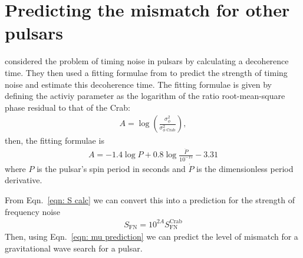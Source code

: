 \documentclass[../full_thesis/full_thesis.tex]{subfiles}
\begin{document}
{\section{Predicting the mismatch for other pulsars}
\citet{Jones2004} considered the problem of timing noise in pulsars by
calculating a decoherence time. They then used a fitting formulae from
\citet{Dewey1989} to predict the strength of timing noise and estimate this
decoherence time. The fitting formulae is given by defining the activiy
parameter as the logarithm of the ratio root-mean-square phase residual
to that of the Crab:
\begin{align}
A = \log\left(\frac{\sigma^{2}_{\phi}}{\sigma_{\phi\; \textrm{Crab}}^{2}}\right),
\end{align}
then, the fitting formulae is
\begin{align}
A = -1.4\log P + 0.8 \log \frac{\dot{P}}{10^{-15}} - 3.31
\end{align}
where $P$ is the pulsar's spin period in seconds and $\dot{P}$ is the
dimensionless period derivative.

From Eqn.~\eqref{eqn: S calc} we can convert this into a prediction for the
strength of frequency noise
\begin{align}
S_{\textrm{FN}} = 10^{2A} S_{\textrm{FN}}^{\textrm{Crab}}
\label{eqn: SFN prediction}
\end{align}
Then, using Eqn.~\eqref{eqn: mu prediction} we can predict the level of mismatch
for a gravitational wave search for a pulsar.

}
\end{document}
